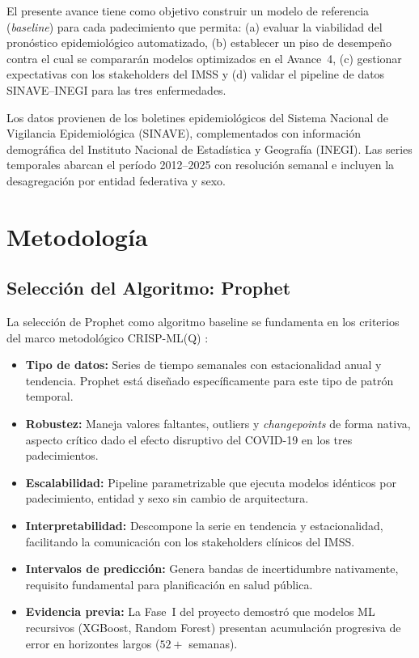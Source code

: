 \documentclass[11pt,a4paper]{article}
\begin{document}
El presente avance tiene como objetivo construir un modelo de referencia (\emph{baseline}) para cada padecimiento que permita: (a) evaluar la viabilidad del pronóstico epidemiológico automatizado, (b) establecer un piso de desempeño contra el cual se compararán modelos optimizados en el Avance~4, (c) gestionar expectativas con los stakeholders del IMSS y (d) validar el pipeline de datos SINAVE--INEGI para las tres enfermedades.

Los datos provienen de los boletines epidemiológicos del Sistema Nacional de Vigilancia Epidemiológica (SINAVE), complementados con información demográfica del Instituto Nacional de Estadística y Geografía (INEGI). Las series temporales abarcan el período 2012--2025 con resolución semanal e incluyen la desagregación por entidad federativa y sexo.

\section{Metodología}\label{sec:metodo}

\subsection{Selección del Algoritmo: Prophet}\label{sec:justificacion-prophet}

La selección de Prophet \citep{taylor2018forecasting} como algoritmo baseline se fundamenta en los criterios del marco metodológico CRISP-ML(Q) \citep{studer2021crisp}:

\begin{itemize}[nosep]
    \item \textbf{Tipo de datos:} Series de tiempo semanales con estacionalidad anual y tendencia. Prophet está diseñado específicamente para este tipo de patrón temporal.
    \item \textbf{Robustez:} Maneja valores faltantes, outliers y \emph{changepoints} de forma nativa, aspecto crítico dado el efecto disruptivo del COVID-19 en los tres padecimientos.
    \item \textbf{Escalabilidad:} Pipeline parametrizable que ejecuta modelos idénticos por padecimiento, entidad y sexo sin cambio de arquitectura.
    \item \textbf{Interpretabilidad:} Descompone la serie en tendencia y estacionalidad, facilitando la comunicación con los stakeholders clínicos del IMSS.
    \item \textbf{Intervalos de predicción:} Genera bandas de incertidumbre nativamente, requisito fundamental para planificación en salud pública.
    \item \textbf{Evidencia previa:} La Fase~I del proyecto demostró que modelos ML recursivos (XGBoost, Random Forest) presentan acumulación progresiva de error en horizontes largos ($52+$ semanas).
\end{itemize}
\end{document}
